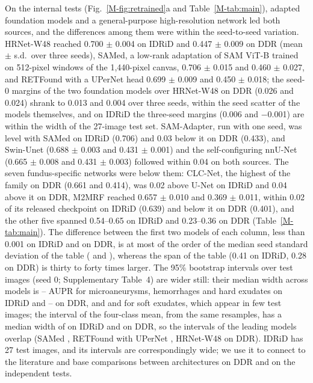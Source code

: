 On the internal tests (Fig.~\ref{M-fig:retrained}a and Table~\ref{M-tab:main}), adapted foundation models and a general-purpose high-resolution network led both sources, and the differences among them were within the seed-to-seed variation. HRNet-W48 reached 0.700 $\pm$ 0.004 \mAUPR{} on IDRiD and 0.447 $\pm$ 0.009 on DDR (mean $\pm$ s.d.\ over three seeds), SAMed, a low-rank adaptation of SAM ViT-B trained on 512-pixel windows of the 1,440-pixel canvas, 0.706 $\pm$ 0.015 and 0.460 $\pm$ 0.027, and RETFound with a UPerNet head 0.699 $\pm$ 0.009 and 0.450 $\pm$ 0.018; the seed-0 margins of the two foundation models over HRNet-W48 on DDR (0.026 and 0.024) shrank to 0.013 and 0.004 over three seeds, within the seed scatter of the models themselves, and on IDRiD the three-seed margins (0.006 and $-$0.001) are within the width of the 27-image test set. SAM-Adapter, run with one seed, was level with SAMed on IDRiD (0.706) and 0.03 below it on DDR (0.433), and Swin-Unet (0.688 $\pm$ 0.003 and 0.431 $\pm$ 0.001) and the self-configuring nnU-Net (0.665 $\pm$ 0.008 and 0.431 $\pm$ 0.003) followed within 0.04 on both sources. The seven fundus-specific networks were below them: CLC-Net, the highest of the family on DDR (0.661 and 0.414), was 0.02 above U-Net on IDRiD and 0.04 above it on DDR, M2MRF reached 0.657 $\pm$ 0.010 and 0.369 $\pm$ 0.011, within 0.02 of its released checkpoint on IDRiD (0.639) and below it on DDR (0.401), and the other five spanned 0.54--0.65 on IDRiD and 0.23--0.36 on DDR (Table~\ref{M-tab:main}). The difference between the first two models of each column, less than 0.001 on IDRiD and  on DDR, is at most of the order of the median seed standard deviation of the table ( and ), whereas the span of the table (0.41 on IDRiD, 0.28 on DDR) is thirty to forty times larger. The 95\% bootstrap intervals over test images (seed 0; Supplementary Table~4) are wider still: their median width across models is -- AUPR for microaneurysms, hemorrhages and hard exudates on IDRiD and -- on DDR, and  and  for soft exudates, which appear in few test images; the interval of the four-class mean, from the same resamples, has a median width of  on IDRiD and  on DDR, so the intervals of the leading models overlap (SAMed , RETFound with UPerNet , HRNet-W48  on DDR). IDRiD has 27 test images, and its intervals are correspondingly wide; we use it to connect to the literature and base comparisons between architectures on DDR and on the independent tests.


